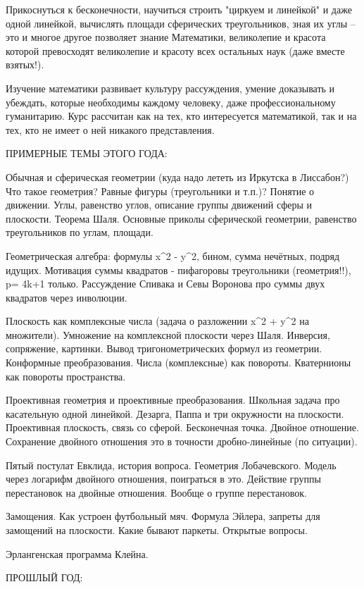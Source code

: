 Прикоснуться к бесконечности, научиться строить "циркуем и линейкой" и даже
одной линейкой, вычислять площади сферических треугольников, зная их углы – 
это и многое другое позволяет знание Математики, великолепие и красота которой 
превосходят великолепие и красоту всех остальных наук (даже вместе взятых!). 

Изучение математики развивает культуру рассуждения, умение доказывать и 
убеждать, которые необходимы каждому человеку, даже профессиональному 
гуманитарию. Курс рассчитан как на тех, кто интересуется математикой, так и 
на тех, кто не имеет о ней никакого представления.

ПРИМЕРНЫЕ ТЕМЫ ЭТОГО ГОДА:

Обычная и сферическая геометрии (куда надо лететь из Иркутска в Лиссабон?)
Что такое геометрия? Равные фигуры (треугольники и т.п.)? Понятие о движении.
Углы, равенство углов, описание группы движений сферы и плоскости. Теорема Шаля.
Основные приколы сферической геометрии, равенство треугольников по углам, площади.

Геометрическая алгебра: формулы x^2 - y^2, бином, сумма нечётных, подряд идущих.
Мотивация суммы квадратов - пифагоровы треугольники (геометрия!!), p= 4k+1 только. 
Рассуждение Спивака и Севы Воронова про суммы двух квадратов через инволюции.

Плоскость как комплексные числа (задача о разложении x^2 + y^2 на множители).
Умножение на комплексной плоскости через Шаля. Инверсия, сопряжение, картинки.
Вывод тригонометрических формул из геометрии. Конформные преобразования.
Числа (комплексные) как повороты. Кватернионы как повороты пространства.

Проективная геометрия и проективные преобразования. Школьная задача про
касательную одной линейкой. Дезарга, Паппа и три окружности на плоскости.
Проективная плоскость, связь со сферой. Бесконечная точка. Двойное отношение.
Сохранение двойного отношения это в точности дробно-линейные (по ситуации).

Пятый постулат Евклида, история вопроса. Геометрия Лобачевского. Модель
через логарифм двойного отношения, поиграться в это. Действие группы
перестановок на двойные отношения. Вообще о группе перестановок.

Замощения. Как устроен футбольный мяч. Формула Эйлера, запреты для
замощений на плоскости. Какие бывают паркеты. Открытые вопросы.

Эрлангенская программа Клейна.

ПРОШЛЫЙ ГОД:

